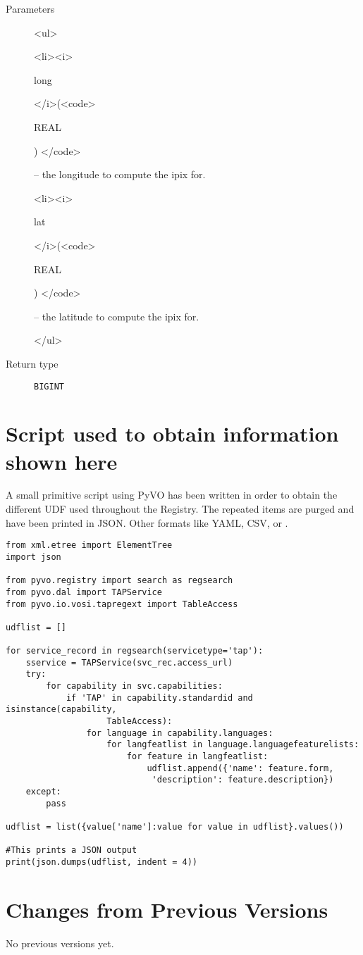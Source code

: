 \documentclass[11pt,a4paper]{ivoa}
\newenvironment{args}%
{\begin{html}<ul>\end{html}\def\arg##1(##2){\begin{html}<li><i>\end{html}%
  ##1 \begin{html}</i>(<code>\end{html}##2\begin{html}) </code>\end{html}}}%
{\begin{html}</ul>\end{html}}
\newenvironment{args}%
  {\hfil %
    \def\arg##1(##2){\item {\textit{##1} (\texttt{##2})}}
    \begin{list}{$\bullet$}{\topsep=0pt\partopsep=0pt\parsep=0pt}
    }%
  {\end{list}}
\begin{document}
\begin{description}
\item[Parameters]
\begin{args}
	\arg long (REAL) -- the longitude to compute the ipix for.
	\arg lat (REAL) -- the latitude to compute the ipix for.
\end{args}

\item[Return type] \texttt{BIGINT}
\end{description}

\appendix

\section{Script used to obtain information shown here}

A small primitive script using PyVO has been written in order to obtain
the different UDF used throughout the Registry. The repeated items are
purged and have been printed in JSON. Other formats like YAML, CSV, or .

\begin{lstlisting}
from xml.etree import ElementTree
import json

from pyvo.registry import search as regsearch
from pyvo.dal import TAPService
from pyvo.io.vosi.tapregext import TableAccess

udflist = []

for service_record in regsearch(servicetype='tap'):
    sservice = TAPService(svc_rec.access_url)
    try: 
        for capability in svc.capabilities:
            if 'TAP' in capability.standardid and isinstance(capability,
                    TableAccess):
                for language in capability.languages:
                    for langfeatlist in language.languagefeaturelists:
                        for feature in langfeatlist:
                            udflist.append({'name': feature.form,
                             'description': feature.description})
    except:
        pass

udflist = list({value['name']:value for value in udflist}.values())

#This prints a JSON output
print(json.dumps(udflist, indent = 4))
\end{lstlisting}

\section{Changes from Previous Versions}

No previous versions yet.  



\end{document}
